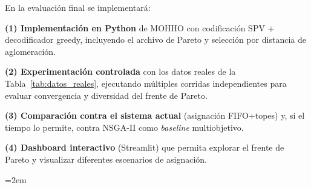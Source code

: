 \documentclass[12pt,letterpaper]{article}
\begin{document}
En la evaluación final se implementará:

\textbf{(1) Implementación en Python} de MOHHO con codificación SPV + decodificador greedy, incluyendo el archivo de Pareto y selección por distancia de aglomeración.

\textbf{(2) Experimentación controlada} con los datos reales de la Tabla~\ref{tab:datos_reales}, ejecutando múltiples corridas independientes para evaluar convergencia y diversidad del frente de Pareto.

\textbf{(3) Comparación contra el sistema actual} (asignación FIFO+topes) y, si el tiempo lo permite, contra NSGA-II como \textit{baseline} multiobjetivo.

\textbf{(4) Dashboard interactivo} (Streamlit) que permita explorar el frente de Pareto y visualizar diferentes escenarios de asignación.


\newpage
\begingroup
\emergencystretch=2em
\printbibliography[title={Referencias}]
\endgroup
\end{document}
